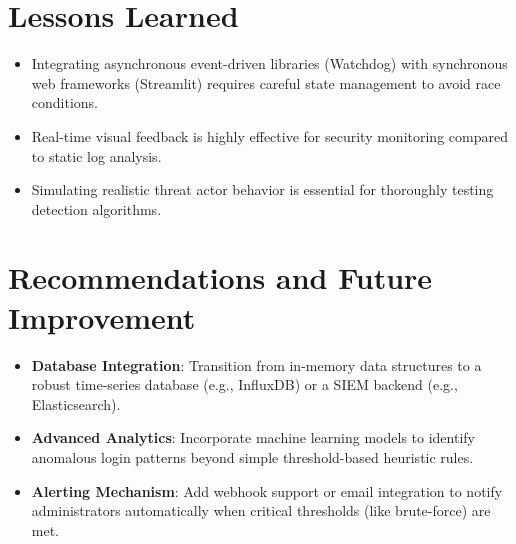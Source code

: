 \documentclass[12pt,a4paper]{article}
\begin{document}
\section{Lessons Learned}
\begin{itemize}
    \item Integrating asynchronous event-driven libraries (Watchdog) with synchronous web frameworks (Streamlit) requires careful state management to avoid race conditions.
    \item Real-time visual feedback is highly effective for security monitoring compared to static log analysis.
    \item Simulating realistic threat actor behavior is essential for thoroughly testing detection algorithms.
\end{itemize}

\section{Recommendations and Future Improvement}
\begin{itemize}
    \item \textbf{Database Integration}: Transition from in-memory data structures to a robust time-series database (e.g., InfluxDB) or a SIEM backend (e.g., Elasticsearch).
    \item \textbf{Advanced Analytics}: Incorporate machine learning models to identify anomalous login patterns beyond simple threshold-based heuristic rules.
    \item \textbf{Alerting Mechanism}: Add webhook support or email integration to notify administrators automatically when critical thresholds (like brute-force) are met.
\end{itemize}
\end{document}
